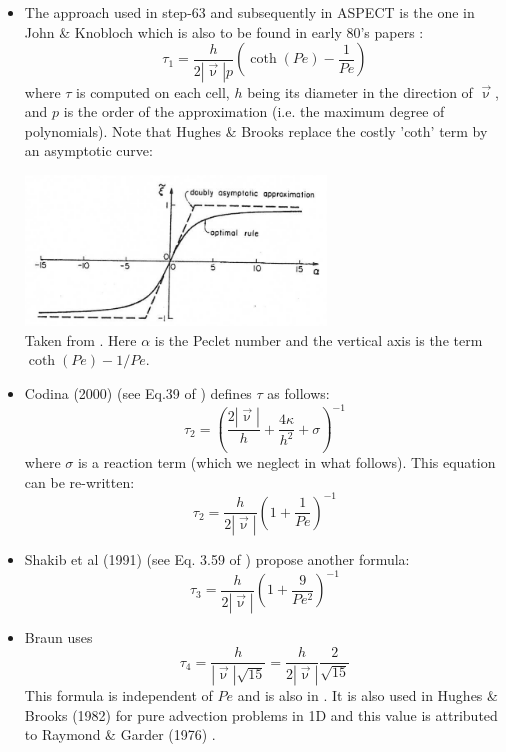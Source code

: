 \begin{itemize}
\item The approach used in step-63 and subsequently in ASPECT is the 
one in John \& Knobloch \cite{jokn06,knob08} which is also to be found in early 
80's papers \cite{brhu82,hubr82}:
\[
\tau_1 = \frac{h}{2 |\vec\upnu| p} \left( \coth (Pe) - \frac{1}{Pe} \right)
\]
where $\tau$ is computed on each cell, $h$ being its diameter in the direction of $\vec\upnu$, 
and $p$ is the order of the approximation (i.e. the maximum degree of polynomials).
Note that Hughes \& Brooks \cite{hubr82} replace the costly 'coth' term by an asymptotic curve:

\begin{center}
\includegraphics[width=8cm]{images/supg/hubr82}\\
{\captionfont Taken from \cite{hubr82}. Here $\alpha$ is the Peclet number and the vertical axis
is the term $ \coth (Pe) -1/Pe$.}
\end{center}


\item
Codina (2000) (see Eq.39 of \cite{codi00}) defines $\tau$ as follows:
\[
\tau_2= \left( \frac{2 |\vec\upnu|}{h} + \frac{4 \kappa}{h^2} + \sigma   \right)^{-1}
\]
where $\sigma$ is a reaction term (which we neglect in what follows). This equation 
can be re-written:
\[
\tau_2= \frac{h}{2 |\vec\upnu|} \left( 1 + \frac{1}{Pe} \right)^{-1}
\]

\item
Shakib et al (1991) (see Eq. 3.59 of \cite{shhj91}) propose another formula:
\[
\tau_3= \frac{h}{2 |\vec\upnu|} \left( 1 + \frac{9}{Pe^2} \right)^{-1}
\]

\item
Braun \cite{brau03} uses 
\[
\tau_4 = \frac{h}{|\vec\upnu| \sqrt{15}} = \frac{h}{2|\vec\upnu|} \frac{2}{\sqrt{15}} 
\]
This formula is independent of $Pe$ and is also in \cite{bogs04}.
It is also used in Hughes \& Brooks (1982) \cite{hubr82} for pure advection problems in 1D
and this value is attributed to Raymond \& Garder (1976)  \cite{raga76}.


\end{itemize}
